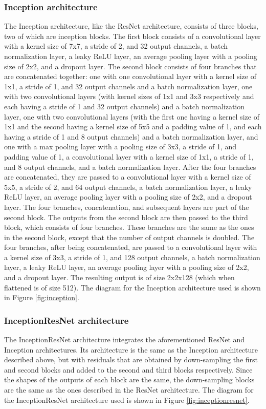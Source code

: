 \documentclass{article}
\begin{document}
\subsubsection{Inception architecture}
The Inception architecture, like the ResNet architecture, consists of three blocks, two of which are inception blocks. The first block consists of a convolutional layer with a kernel size of 7x7, a stride of 2, and 32 output channels, a batch normalization layer, a leaky ReLU layer, an average pooling layer with a pooling size of 2x2, and a dropout layer. The second block consists of four branches that are concatenated together: one with one convolutional layer with a kernel size of 1x1, a stride of 1, and 32 output channels and a batch normalization layer, one with two convolutional layers (with kernel sizes of 1x1 and 3x3 respectively and each having a stride of 1 and 32 output channels) and a batch normalization layer, one with two convolutional layers (with the first one having a kernel size of 1x1 and the second having a kernel size of 5x5 and a padding value of 1, and each having a stride of 1 and 8 output channels) and a batch normalization layer, and one with a max pooling layer with a pooling size of 3x3, a stride of 1, and padding value of 1, a convolutional layer with a kernel size of 1x1, a stride of 1, and 8 output channels, and a batch normalization layer. After the four branches are concatenated, they are passed to a convolutional layer with a kernel size of 5x5, a stride of 2, and 64 output channels, a batch normalization layer, a leaky ReLU layer, an average pooling layer with a pooling size of 2x2, and a dropout layer. The four branches, concatenation, and subsequent layers are part of the second block. The outputs from the second block are then passed to the third block, which consists of four branches. These branches are the same as the ones in the second block, except that the number of output channels is doubled. The four branches, after being concatenated, are passed to a convolutional layer with a kernel size of 3x3, a stride of 1, and 128 output channels, a batch normalization layer, a leaky ReLU layer, an average pooling layer with a pooling size of 2x2, and a dropout layer. The resulting output is of size 2x2x128 (which when flattened is of size 512). The diagram for the Inception architecture used is shown in Figure \ref{fig:inception}.



\subsubsection{InceptionResNet architecture}
The InceptionResNet architecture integrates the aforementioned ResNet and Inception architectures. Its architecture is the same as the Inception architecture described above, but with residuals that are obtained by down-sampling the first and second blocks and added to the second and third blocks respectively. Since the shapes of the outputs of each block are the same, the down-sampling blocks are the same as the ones described in the ResNet architecture. The diagram for the InceptionResNet architecture used is shown in Figure \ref{fig:inceptionresnet}.
\end{document}
